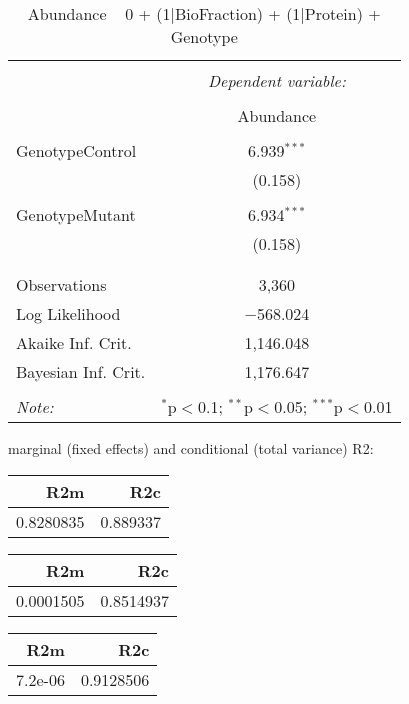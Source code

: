 \documentclass[11pt]{report}
\begin{document}
\begin{table}[!htbp] \centering 
  \caption{Abundance ~ 0 + (1|BioFraction) + (1|Protein) + Genotype} 
  \label{} 
\begin{tabular}{@{\extracolsep{5pt}}lc} 
\\[-1.8ex]\hline 
\hline \\[-1.8ex] 
 & \multicolumn{1}{c}{\textit{Dependent variable:}} \\ 
\cline{2-2} 
\\[-1.8ex] & Abundance \\ 
\hline \\[-1.8ex] 
 GenotypeControl & 6.939$^{***}$ \\ 
  & (0.158) \\ 
  & \\ 
 GenotypeMutant & 6.934$^{***}$ \\ 
  & (0.158) \\ 
  & \\ 
\hline \\[-1.8ex] 
Observations & 3,360 \\ 
Log Likelihood & $-$568.024 \\ 
Akaike Inf. Crit. & 1,146.048 \\ 
Bayesian Inf. Crit. & 1,176.647 \\ 
\hline 
\hline \\[-1.8ex] 
\textit{Note:}  & \multicolumn{1}{r}{$^{*}$p$<$0.1; $^{**}$p$<$0.05; $^{***}$p$<$0.01} \\ 
\end{tabular} 
\end{table} 
marginal (fixed effects) and conditional (total variance) R2:

\begin{tabular}{r|r}
\hline
R2m & R2c\\
\hline
0.8280835 & 0.889337\\
\hline
\end{tabular}

\begin{tabular}{r|r}
\hline
R2m & R2c\\
\hline
0.0001505 & 0.8514937\\
\hline
\end{tabular}

\begin{tabular}{r|r}
\hline
R2m & R2c\\
\hline
7.2e-06 & 0.9128506\\
\hline
\end{tabular}
\end{document}
